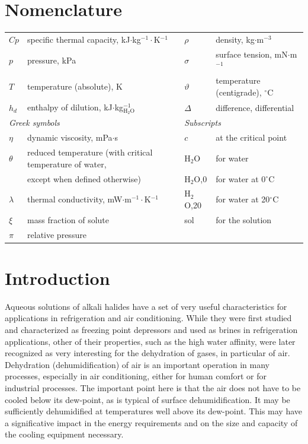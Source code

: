 \documentclass[11pt]{article}
\begin{document}
\section*{Nomenclature}
\begin{tabular}{@{}ll@{\hspace{2cm}}ll@{}}
$Cp$ & specific thermal capacity, kJ$\cdot$kg$^{-1}\cdot$K$^{-1}$ & $\rho$ & density, kg$\cdot$m$^{-3}$ \\
$p$ & pressure, kPa & $\sigma$ & surface tension, mN$\cdot$m$^{-1}$ \\
$T$ & temperature (absolute), K & $\vartheta$ & temperature (centigrade), $^{\circ}$C \\
$h_d$ & enthalpy of dilution, kJ$\cdot$kg$_{\mathrm{H_2O}}^{-1}$ & $\Delta$ & difference, differential \\
\multicolumn{2}{l}{\textit{Greek symbols}} & \multicolumn{2}{l}{\textit{Subscripts}} \\
$\eta$ & dynamic viscosity, mPa$\cdot$s & $c$ & at the critical point \\
$\theta$ & reduced temperature (with critical temperature of water, & H$_2$O & for water \\
 & except when defined otherwise) & H$_2$O,0 & for water at 0$^{\circ}$C \\
$\lambda$ & thermal conductivity, mW$\cdot$m$^{-1}\cdot$K$^{-1}$ & H$_2$O,20 & for water at 20$^{\circ}$C \\
$\xi$ & mass fraction of solute & sol & for the solution \\
$\pi$ & relative pressure & & \\
\end{tabular}

\section{Introduction}

Aqueous solutions of alkali halides have a set of very useful characteristics for
applications in refrigeration and air conditioning. While they were first studied and
characterized as freezing point depressors and used as brines in refrigeration
applications, other of their properties, such as the high water affinity, were later
recognized as very interesting for the dehydration of gases, in particular of air.
Dehydration (dehumidification) of air is an important operation in many processes,
especially in air conditioning, either for human comfort or for industrial processes. The
important point here is that the air does not have to be cooled below its dew-point, as is
typical of surface dehumidification. It may be sufficiently dehumidified at temperatures
well above its dew-point. This may have a significative impact in the energy requirements
and on the size and capacity of the cooling equipment necessary.
\end{document}
